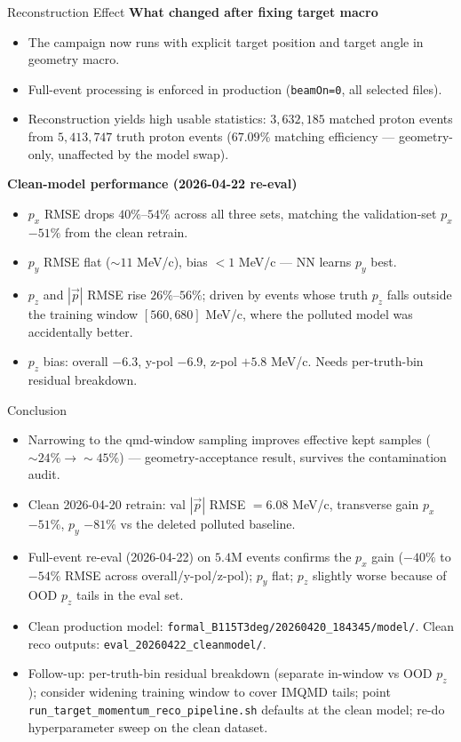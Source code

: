 \documentclass[11pt]{beamer}
\begin{document}
\begin{frame}{Reconstruction Effect}
\textbf{What changed after fixing target macro}
\begin{itemize}
\item The campaign now runs with explicit target position and target angle in geometry macro.
\item Full-event processing is enforced in production (\texttt{beamOn=0}, all selected files).
\item Reconstruction yields high usable statistics:
\(3{,}632{,}185\) matched proton events from \(5{,}413{,}747\) truth proton events
(\(67.09\%\) matching efficiency --- geometry-only, unaffected by the model swap).
\end{itemize}

\textbf{Clean-model performance (2026-04-22 re-eval)}
\begin{itemize}
\item \(p_x\) RMSE drops \(40\%\)--\(54\%\) across all three sets, matching
the validation-set \(p_x\) \(-51\%\) from the clean retrain.
\item \(p_y\) RMSE flat (\(\sim 11\) MeV/c), bias \(<1\) MeV/c --- NN learns \(p_y\) best.
\item \(p_z\) and \(|\vec p|\) RMSE rise \(26\%\)--\(56\%\); driven by events whose
truth \(p_z\) falls outside the training window \([560, 680]\) MeV/c, where
the polluted model was accidentally better.
\item \(p_z\) bias: overall \(-6.3\), y-pol \(-6.9\), z-pol \(+5.8\) MeV/c. Needs
per-truth-bin residual breakdown.
\end{itemize}
\end{frame}

\begin{frame}{Conclusion}
\begin{itemize}
\item Narrowing to the qmd-window sampling improves effective kept
samples (\(\sim24\%\rightarrow\sim45\%\)) --- geometry-acceptance result,
survives the contamination audit.
\item Clean 2026-04-20 retrain: val \(|\vec p|\) RMSE \(= 6.08\) MeV/c,
transverse gain \(p_x\) \(-51\%\), \(p_y\) \(-81\%\) vs the deleted polluted
baseline.
\item Full-event re-eval (2026-04-22) on \(5.4\)M events confirms the
\(p_x\) gain (\(-40\%\) to \(-54\%\) RMSE across overall/y-pol/z-pol); \(p_y\)
flat; \(p_z\) slightly worse because of OOD \(p_z\) tails in the eval set.
\item Clean production model: \texttt{formal\_B115T3deg/20260420\_184345/model/}.
Clean reco outputs: \texttt{eval\_20260422\_cleanmodel/}.
\item Follow-up: per-truth-bin residual breakdown (separate in-window vs
OOD \(p_z\)); consider widening training window to cover IMQMD tails; point
\texttt{run\_target\_momentum\_reco\_pipeline.sh} defaults at the clean model;
re-do hyperparameter sweep on the clean dataset.
\end{itemize}
\end{frame}
\end{document}
